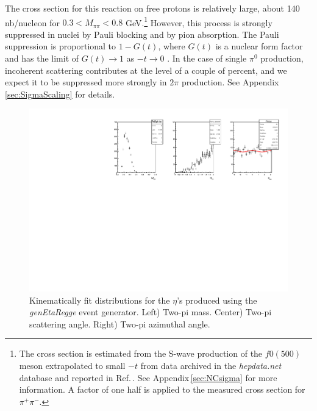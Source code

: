 The cross section for this reaction on free protons is relatively large, about 140 nb/nucleon  for $0.3 < M_{\pi\pi} < 0.8$ GeV.\footnote{The cross section is estimated from the S-wave production of the $f0(500)$ meson extrapolated to small $-t$ from data archived in the {\em hepdata.net} database and reported in Ref.\,\cite{Battaglieri:2009aa}. See Appendix\,\ref{sec:NCsigma} for more information. A factor of one half is applied to the measured cross section for $\pi^+\pi^-$.} However, this process is strongly suppressed in nuclei by Pauli blocking and by pion absorption. The Pauli suppression is proportional to $1-G(t)$, where $G(t)$ is a nuclear form factor and has the limit of $G(t)\to1$ as $-t\to0$ \cite{Gevorkyan:2009ge,primex_inc}. In the case of single $\pi^0$ production, incoherent scattering contributes at the level of a couple of percent, and we expect it to be suppressed more strongly in $2\pi$ production. See Appendix\,\ref{sec:SigmaScaling} for details.

\begin{figure}[tbp]
\begin{center}
\includegraphics[width=16cm,clip=true]{figures/twopi_primakoff_DSelect_test_File_20000_eta.pdf}
\caption{Kinematically fit distributions for the $\eta$'s produced using the {\em genEtaRegge} event generator.
Left) Two-pi mass. Center) Two-pi scattering angle. Right) Two-pi azimuthal angle.
\label{fig:eta}}
\end{center} 
\end{figure}




